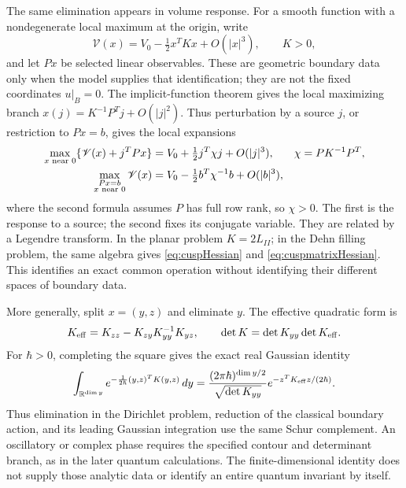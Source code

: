 The same elimination appears in volume response. For a smooth function
with a nondegenerate local maximum at the origin, write
\[
 \mathscr V(x)=V_0-\tfrac12x^TKx+O(|x|^3),\qquad K>0,
\]
and let $Px$ be selected linear observables. These are geometric boundary
data only when the model supplies that identification; they are not the
fixed coordinates $u|_B=0$. The implicit-function theorem gives the local
maximizing branch $x(j)=K^{-1}P^Tj+O(|j|^2)$. Thus perturbation by a
source $j$, or restriction to $Px=b$, gives the local expansions
\begin{align}
 \max_{x\text{ near }0}\{\mathscr V(x)+j^TPx\}
    &=V_0+\tfrac12j^T\chi j+O(|j|^3),
 &\chi&=PK^{-1}P^T,\notag\\
 \max_{\substack{Px=b\\x\text{ near }0}}\mathscr V(x)
    &=V_0-\tfrac12b^T\chi^{-1}b+O(|b|^3),
 \label{eq:ipolyBoundaryResponse}
\end{align}
where the second formula assumes $P$ has full row rank, so $\chi>0$.
The first is the response to a source; the second fixes its conjugate
variable. They are related by a Legendre transform. In the planar
problem $K=2L_{II}$; in the Dehn filling problem, the same algebra gives
\eqref{eq:cuspHessian} and \eqref{eq:cuspmatrixHessian}. This identifies
an exact common operation without identifying their different spaces
of boundary data.

More generally, split $x=(y,z)$ and eliminate $y$. The effective
quadratic form is
\begin{equation}
 K_{\rm eff}=K_{zz}-K_{zy}K_{yy}^{-1}K_{yz},\qquad
 \det K=\det K_{yy}\det K_{\rm eff}.
 \label{eq:ipolySchur}
\end{equation}
For $\hbar>0$, completing the square gives the exact real Gaussian identity
\begin{equation}
 \int_{\mathbb R^{\dim y}}
 e^{-\frac1{2\hbar}(y,z)^TK(y,z)}\,dy
 =\frac{(2\pi\hbar)^{\dim y/2}}{\sqrt{\det K_{yy}}}
       e^{-z^TK_{\rm eff}z/(2\hbar)}.
 \label{eq:ipolyGaussian}
\end{equation}
Thus elimination in the Dirichlet problem, reduction of the classical
boundary action, and its leading Gaussian integration use the same
Schur complement. An oscillatory or complex phase requires the specified
contour and determinant branch, as in the later quantum calculations.
The finite-dimensional identity does not supply those analytic data
or identify an entire quantum invariant by itself.

